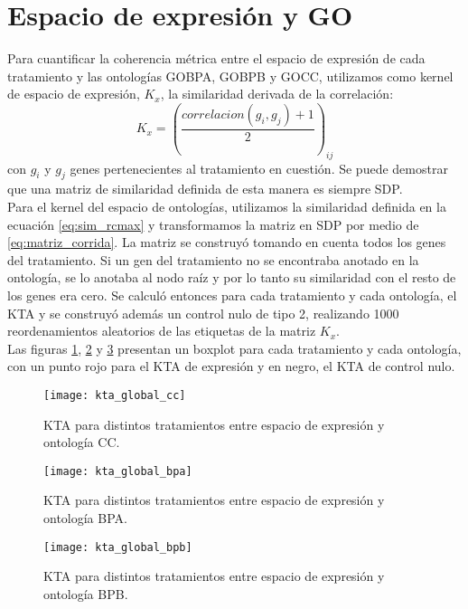 \section{Espacio de expresión y GO}
Para cuantificar la coherencia métrica entre el espacio de expresión de cada tratamiento y las ontologías GOBPA, GOBPB y GOCC, utilizamos como kernel de espacio de expresión, $K_x$, la similaridad derivada de la correlación:
\begin{equation}
	K_x = (\frac{correlacion(g_i, g_j)+1}{2})_{ij}
	\label{eq:similaridad_de_correlacion}
\end{equation}
con $g_i$ y $g_j$ genes pertenecientes al tratamiento en cuestión. Se puede demostrar que una matriz de similaridad definida de esta manera es siempre SDP.\\
Para el kernel del espacio de ontologías, utilizamos la similaridad definida en la ecuación \ref{eq:sim_rcmax} y transformamos la matriz en SDP por medio de \ref{eq:matriz_corrida}. La matriz se construyó tomando en cuenta todos los genes del tratamiento. Si un gen del tratamiento no se encontraba anotado en la ontología, se lo anotaba al nodo raíz y por lo tanto su similaridad con el resto de los genes era cero. Se calculó entonces para cada tratamiento y cada ontología, el KTA y se construyó además un control nulo de tipo 2, realizando 1000 reordenamientos aleatorios de las etiquetas de la matriz $K_x$.\\
Las figuras \ref{fig:kta_global_cc}, \ref{fig:kta_global_bpa} y \ref{fig:kta_global_bpb} presentan un boxplot para cada tratamiento y cada ontología, con un punto rojo para el KTA de expresión y en negro, el KTA de control nulo. 
\begin{figure}[h!]
\centering
\texttt{[image: kta\_global\_cc]}
\caption{KTA para distintos tratamientos entre espacio de expresión y ontología CC.}
\label{fig:kta_global_cc}
\end{figure}
\begin{figure}[h!]
\centering
\texttt{[image: kta\_global\_bpa]}
\caption{KTA para distintos tratamientos entre espacio de expresión y ontología BPA.}
\label{fig:kta_global_bpa}
\end{figure}
\begin{figure}[h!]
\centering
\texttt{[image: kta\_global\_bpb]}
\caption{KTA para distintos tratamientos entre espacio de expresión y ontología BPB.}
\label{fig:kta_global_bpb}
\end{figure}
